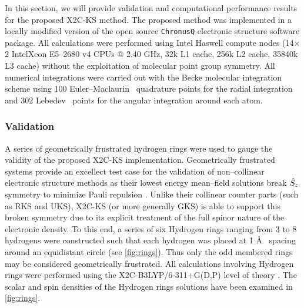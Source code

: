 In this section, we will provide validation and computational performance
results for the proposed X2C-KS method. The proposed method was
implemented in a locally modified version of the open source
\texttt{ChronusQ} \cite{chronusq_beta2} electronic structure software package.
All calculations were performed using Intel Haswell compute nodes (14$\times$2
Intel\textregistered Xeon E5--2680 v4 CPUs @ 2.40 GHz, 32k L1 cache, 256k L2
cache, 35840k L3 cache) without the exploitation of molecular point group
symmetry. All numerical integrations were carried out with the Becke molecular
integration scheme using 100 Euler--Maclaurin~\cite{Laming93_997} quadrature points for the
radial integration and 302 Lebedev~\cite{Lebedev77_99} points for the angular integration around
each atom.

\subsubsection{Validation}
\label{sec:NCDFT_VALID}

A series of geometrically frustrated hydrogen rings were used to gauge the validity of the 
proposed X2C-KS implementation. Geometrically frustrated systems
provide an excellect test case for the validation of non--collinear electronic structure
methods as their lowest energy mean--field solutions break $\hat{S}_z$ symmetry to minimize
Pauli repulsion \cite{Gross07_196405,Frisch07_125119,Frisch12_2193,Scuseria13_035117,Yamaguchi01_670,Blochl03_15772,Truhlar11_2629,Truhlar13_5349,Li15_154109} .
Unlike their collinear counter parts (such as RKS and UKS), X2C-KS (or more generally GKS)
is able to support this broken symmetry due to its explicit treatment of the full
spinor nature of the electronic density. To this end, a series of six Hydrogen rings ranging from 3 to
8 hydrogens were constructed such that each hydrogen was placed at 1 \AA~ spacing around 
an equidistant circle (see \cref{fig:rings}). Thus only the odd membered rings may be considered geometrically
frustrated. All calculations involving Hydrogen rings were performed using the X2C-B3LYP/6-311+G(D,P)
level of theory \cite{Becke93_5648,Parr88_785,Preuss89_200}. 
The scalar and spin densities of the Hydrogen rings solutions have been examined in \cref{fig:rings}. 


